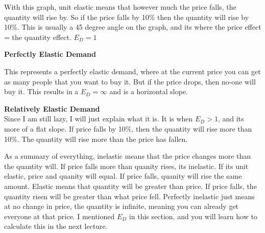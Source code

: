   With this graph, unit elastic means that however much the price falls, the quantity will rise by. So if the price falls by 10\% then the quantity will rise by 10\%. This is usually a 45 degree angle on the graph, and its where the price effect = the quantity effect. $E_D = 1$

  \textbf{Perfectly Elastic Demand}\\
  \begin{figure}[h!]
  \begin{center}
  \end{center}
  \end{figure} 

  This represents a perfectly elastic demand, where at the current price you can get as many people that you want to buy it. But if the price drops, then no-one will buy it. This results in a $E_D = \infty$ and is a horizontal slope. 

\textbf{Relatively Elastic Demand}\\
Since I am still lazy, I will just explain what it is. It is when $E_D > 1$, and its more of a flat slope. If price falls by 10\%, then the quantity will rise more than 10\%. The quantity will rise more than the price has fallen. 

As a summary of everything, inelastic means that the price changes more than the quantity will. If price falls more than quanity rises, its inelastic. If its unit elastic, price and quanity will equal. If price falls, quanity will rise the same amount. Elastic means that quantity will be greater than price. If price falls, the quantity risen will be greater than what price fell. Perfectly inelastic just means at no change in price, the quantity is infinite, meaning you can already get everyone at that price. I mentioned $E_D$ in this section, and you will learn how to calculate this in the next lecture. 

